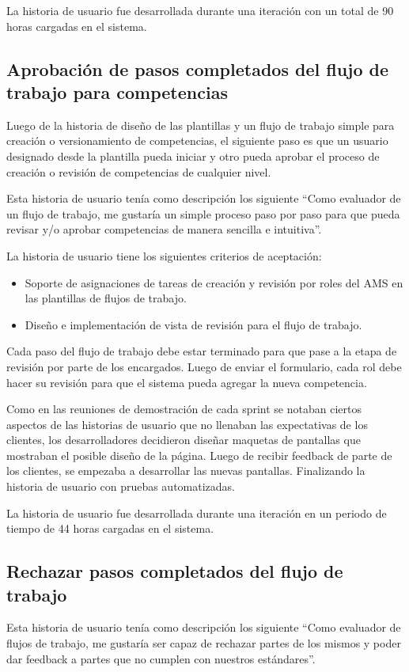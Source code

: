 La historia de usuario fue desarrollada durante una iteración con un total de 90 horas cargadas en el sistema.

\subsection{Aprobación de pasos completados del flujo de trabajo para competencias}

Luego de la historia de diseño de las plantillas y un flujo de trabajo simple para creación o versionamiento de competencias, el siguiente paso es que un usuario designado desde la plantilla pueda iniciar y otro pueda aprobar el proceso de creación o revisión de competencias de cualquier nivel.

Esta historia de usuario tenía como descripción los siguiente \enquote{Como evaluador de un flujo de trabajo, me gustaría un simple proceso paso por paso para que pueda revisar y/o aprobar competencias de manera sencilla e intuitiva}.

La historia de usuario tiene los siguientes criterios de aceptación:
\begin{itemize}
	\item Soporte de asignaciones de tareas de creación y revisión por roles del AMS en las plantillas de flujos de trabajo.
	\item Diseño e implementación de vista de revisión para el flujo de trabajo.
\end{itemize}

Cada paso del flujo de trabajo debe estar terminado para que pase a la etapa de revisión por parte de los encargados. Luego de enviar el formulario, cada rol debe hacer su revisión para que el sistema pueda agregar la nueva competencia.

Como en las reuniones de demostración de cada sprint se notaban ciertos aspectos de las historias de usuario que no llenaban las expectativas de los clientes, los desarrolladores decidieron diseñar maquetas de pantallas que mostraban el posible diseño de la página. Luego de recibir feedback de parte de los clientes, se empezaba a desarrollar las nuevas pantallas. Finalizando la historia de usuario con pruebas automatizadas.

La historia de usuario fue desarrollada durante una iteración en un periodo de tiempo de 44 horas cargadas en el sistema.

\subsection{Rechazar pasos completados del flujo de trabajo}
Esta historia de usuario tenía como descripción los siguiente \enquote{Como evaluador de flujos de trabajo, me gustaría ser capaz de rechazar partes de los mismos y poder dar feedback a partes que no cumplen con nuestros estándares}.

